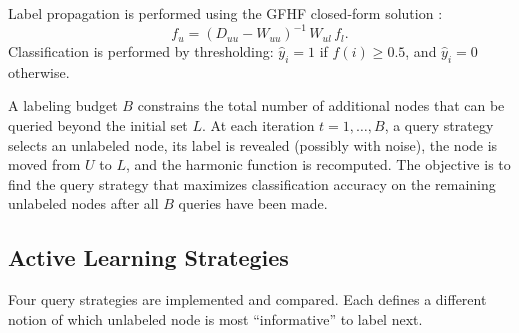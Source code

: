 \documentclass[12pt]{article}
\begin{document}
Label propagation is performed using the GFHF closed-form solution \cite{Zhu2003}:
\[
f_u = (D_{uu} - W_{uu})^{-1}\, W_{ul}\, f_l.
\]
Classification is performed by thresholding: $\hat{y}_i = 1$ if $f(i) \geq 0.5$, and $\hat{y}_i = 0$ otherwise.

A labeling budget $B$ constrains the total number of additional nodes that can be queried beyond the initial set $L$. At each iteration $t = 1, \ldots, B$, a query strategy selects an unlabeled node, its label is revealed (possibly with noise), the node is moved from $U$ to $L$, and the harmonic function is recomputed. The objective is to find the query strategy that maximizes classification accuracy on the remaining unlabeled nodes after all $B$ queries have been made.

\subsection{Active Learning Strategies}

Four query strategies are implemented and compared. Each defines a different notion of which unlabeled node is most ``informative'' to label next.
\end{document}
